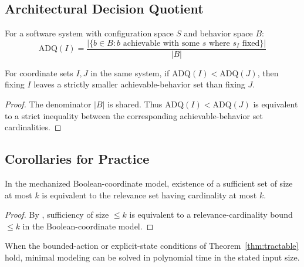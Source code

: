 \subsection{Architectural Decision Quotient}

\begin{definition}
For a software system with configuration space $S$ and behavior space $B$:
\[
\text{ADQ}(I) = \frac{|\{b \in B : b \text{ achievable with some } s \text{ where } s_I \text{ fixed}\}|}{|B|}
\]
\end{definition}

\begin{proposition}\label{prop:adq-ordering}
For coordinate sets $I,J$ in the same system, if $\mathrm{ADQ}(I) < \mathrm{ADQ}(J)$, then fixing $I$ leaves a strictly smaller achievable-behavior set than fixing $J$.
\end{proposition}

\begin{proof}
The denominator $|B|$ is shared. Thus $\mathrm{ADQ}(I) < \mathrm{ADQ}(J)$ is equivalent to a strict inequality between the corresponding achievable-behavior set cardinalities.
\end{proof}

\subsection{Corollaries for Practice}

\begin{corollary}\label{cor:practice-diagnostic}
In the mechanized Boolean-coordinate model, existence of a sufficient set of size at most $k$ is equivalent to the relevance set having cardinality at most $k$.
\end{corollary}

\begin{proof}
By , sufficiency of size $\le k$ is equivalent to a relevance-cardinality bound $\le k$ in the Boolean-coordinate model.
\end{proof}

\begin{corollary}\label{cor:practice-bounded}
When the bounded-action or explicit-state conditions of Theorem~\ref{thm:tractable} hold, minimal modeling can be solved in polynomial time in the stated input size.
\end{corollary}

